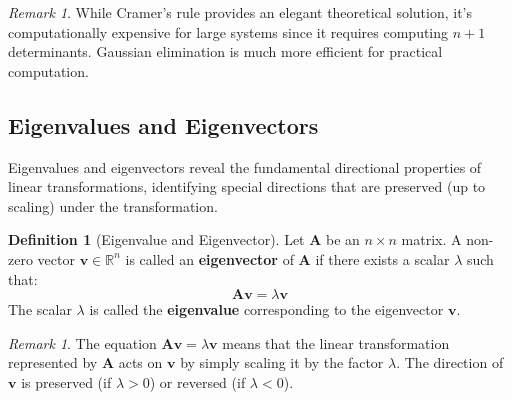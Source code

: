 \documentclass[12pt]{article}
\numberwithin{equation}{section}
\newcommand{\RR}{\mathbb{R}}
\newcommand{\vect}[1]{\boldsymbol{#1}}   %
\newcommand{\mat}[1]{\mathbf{#1}}        %
\theoremstyle{plain}
\theoremstyle{definition}
\newtheorem{definition}[theorem]{Definition}
\theoremstyle{remark}
\newtheorem{remark}[theorem]{Remark}
\begin{document}
\begin{remark}
While Cramer's rule provides an elegant theoretical solution, it's computationally expensive for large systems since it requires computing $n+1$ determinants. Gaussian elimination is much more efficient for practical computation.
\end{remark}

\subsection{Eigenvalues and Eigenvectors}

Eigenvalues and eigenvectors reveal the fundamental directional properties of linear transformations, identifying special directions that are preserved (up to scaling) under the transformation.

\begin{definition}[Eigenvalue and Eigenvector]
Let $\mat{A}$ be an $n \times n$ matrix. A non-zero vector $\vect{v} \in \RR^n$ is called an \textbf{eigenvector} of $\mat{A}$ if there exists a scalar $\lambda$ such that:
$$\mat{A}\vect{v} = \lambda\vect{v}$$
The scalar $\lambda$ is called the \textbf{eigenvalue} corresponding to the eigenvector $\vect{v}$.
\end{definition}

\begin{remark}
The equation $\mat{A}\vect{v} = \lambda\vect{v}$ means that the linear transformation represented by $\mat{A}$ acts on $\vect{v}$ by simply scaling it by the factor $\lambda$. The direction of $\vect{v}$ is preserved (if $\lambda > 0$) or reversed (if $\lambda < 0$).
\end{remark}
\end{document}
